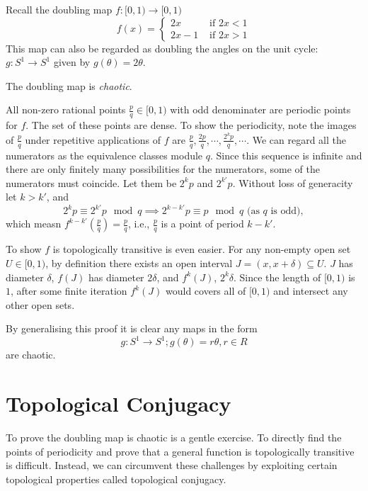 \begin{example}\label{ex_doubling_map}
	Recall the doubling map $f: [0,1) \rightarrow [0,1)$
	\begin{equation}\label{eq:doubling_map}
	f(x) = 
		\begin{cases}
			2x &\text{ if } 2x < 1 \\
			2x -1 &\text{ if } 2x > 1
		\end{cases}
	\end{equation}
	This map can also be regarded as doubling the angles on the unit cycle: $g: S^1 \rightarrow S^1$ given by $ g(\theta) = 2 \theta$.
	
	The doubling map is \textit{chaotic}.

	All non-zero rational points $\frac{p}{q} \in [0,1)$ with odd denominater are periodic points for $f$. 
	The set of these points are dense.
	To show the periodicity, note the images of $\frac{p}{q}$ under repetitive applications of $f$ are $\frac{p}{q}, \frac{2p}{q}, \cdots, \frac{2^k p}{q}, \cdots$.
	We can regard all the numerators as the equivalence classes module $q$.
	Since this sequence is infinite and there are only finitely many possibilities for the numerators, some of the numerators must coincide. Let them be $2^k p$ and $2^{k'} p$. 
	Without loss of generacity let $k > k'$, and
	$$
	2^k p \equiv 2^{k'} p \mod q \implies 
	2^{k-k'} p \equiv p \mod q \text{ (as $q$ is odd)},
	$$
	which measn $f^{k-k'}(\frac{p}{q}) = \frac{p}{q}$, i.e., $\frac{p}{q}$ is a point of period $k - k'$.

	To show $f$ is topologically transitive is even easier. 
	For any non-empty open set $U \in [0,1)$, by definition there exists an open interval $J = (x, x+ \delta) \subseteq U$. 
	$J$ has diameter $\delta$, $f(J)$ has diameter $2 \delta$, and $f^k(J)$, $2^k \delta$. 
	Since the length of $[0,1)$ is $1$, after some finite iteration $f^k(J)$ would covers all of $[0,1)$ and intersect any other open sets.

	By generalising this proof it is clear any maps in the form 
	$$
	g: S^1 \rightarrow S^1; g(\theta) = r \theta, r \in R
	$$
	are chaotic.
\end{example}

\section{Topological Conjugacy}

To prove the doubling map is chaotic is a gentle exercise. 
To directly find the points of periodicity and prove that a general function is topologically transitive is difficult.
Instead, we can circumvent these challenges by exploiting certain topological properties called topological conjugacy.

